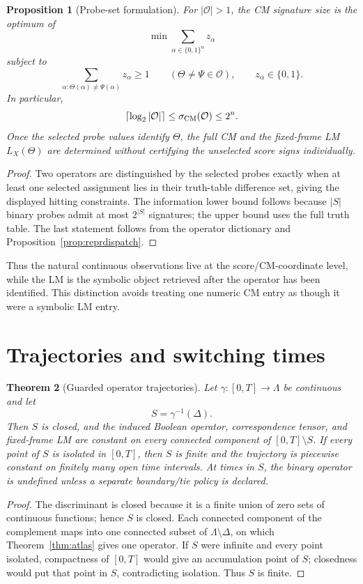 \documentclass[11pt]{article}
\newtheorem{theorem}{Theorem}[section]
\newtheorem{proposition}[theorem]{Proposition}
\theoremstyle{definition}
\theoremstyle{remark}
\newcommand{\B}{\{0,1\}}
\newcommand{\Deltaop}{\Delta}
\begin{document}
\begin{proposition}[Probe-set formulation]\label{prop:probeILP}
For $|\mathcal O|>1$, the CM signature size is the optimum of
\[
 \min\sum_{\alpha\in\B^n} z_\alpha
\]
subject to
\[
 \sum_{\alpha:\Theta(\alpha)\ne\Psi(\alpha)}z_\alpha\ge1
 \qquad(\Theta\ne\Psi\in\mathcal O),
 \qquad z_\alpha\in\{0,1\}.
\]
In particular,
\[
 \left\lceil\log_2|\mathcal O|\right\rceil
 \le \sigma_{\rm CM}(\mathcal O)\le 2^n.
\]
Once the selected probe values identify $\Theta$, the full CM and the fixed-frame LM $L_X(\Theta)$ are determined without certifying the unselected score signs individually.
\end{proposition}

\begin{proof}
Two operators are distinguished by the selected probes exactly when at least one selected assignment lies in their truth-table difference set, giving the displayed hitting constraints. The information lower bound follows because $|S|$ binary probes admit at most $2^{|S|}$ signatures; the upper bound uses the full truth table. The last statement follows from the operator dictionary and Proposition~\ref{prop:reprdispatch}.
\end{proof}

Thus the natural continuous observations live at the score/CM-coordinate level, while the LM is the symbolic object retrieved after the operator has been identified. This distinction avoids treating one numeric CM entry as though it were a symbolic LM entry.

\section{Trajectories and switching times}\label{sec:trajectories}

\begin{theorem}[Guarded operator trajectories]\label{thm:trajectory}
Let $\gamma:[0,T]\to\Lambda$ be continuous and let
\[
 S=\gamma^{-1}(\Deltaop).
\]
Then $S$ is closed, and the induced Boolean operator, correspondence tensor, and fixed-frame LM are constant on every connected component of $[0,T]\setminus S$. If every point of $S$ is isolated in $[0,T]$, then $S$ is finite and the trajectory is piecewise constant on finitely many open time intervals. At times in $S$, the binary operator is undefined unless a separate boundary/tie policy is declared.
\end{theorem}

\begin{proof}
The discriminant is closed because it is a finite union of zero sets of continuous functions; hence $S$ is closed. Each connected component of the complement maps into one connected subset of $\Lambda\setminus\Deltaop$, on which Theorem~\ref{thm:atlas} gives one operator. If $S$ were infinite and every point isolated, compactness of $[0,T]$ would give an accumulation point of $S$; closedness would put that point in $S$, contradicting isolation. Thus $S$ is finite.
\end{proof}
\end{document}
